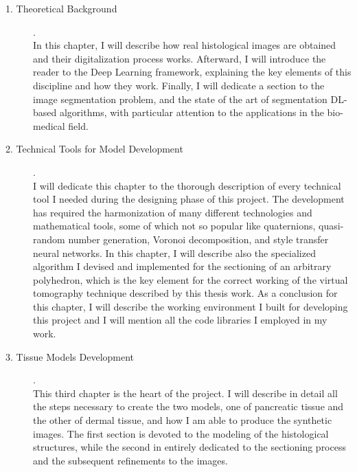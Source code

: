 \begin{description}
    \item [1. Theoretical Background]. \hfill \\
    In this chapter, I will describe how real histological images are obtained and their digitalization process works. Afterward, I will introduce the reader to the Deep Learning framework, explaining the key elements of this discipline and how they work. Finally, I will dedicate a section to the image segmentation problem, and the state of the art of segmentation DL-based algorithms, with particular attention to the applications in the bio-medical field.

    \item [2. Technical Tools for Model Development]. \hfill \\
    I will dedicate this chapter to the thorough description of every technical tool I needed during the designing phase of this project. The development has required the harmonization of many different technologies and mathematical tools, some of which not so popular like quaternions, quasi-random number generation, Voronoi decomposition, and style transfer neural networks. In this chapter, I will describe also the specialized algorithm I devised and implemented for the sectioning of an arbitrary polyhedron, which is the key element for the correct working of the virtual tomography technique described by this thesis work. As a conclusion for this chapter, I will describe the working environment I built for developing this project and I will mention all the code libraries I employed in my work.

    \item [3. Tissue Models Development]. \hfill \\
    This third chapter is the heart of the project. I will describe in detail all the steps necessary to create the two models, one of pancreatic tissue and the other of dermal tissue, and how I am able to produce the synthetic images. The first section is devoted to the modeling of the histological structures, while the second in entirely dedicated to the sectioning process and the subsequent refinements to the images.
\end{description}

